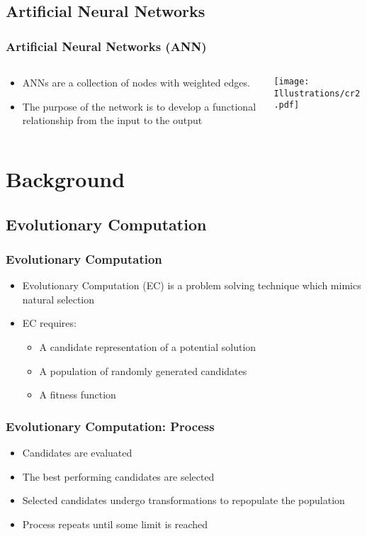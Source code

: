 \documentclass{beamer}
\begin{document}
\subsection{Artificial Neural Networks}
\begin{frame}
  \frametitle{Artificial Neural Networks (ANN)}
\begin{columns}
  \begin{column}{0.5\textwidth}
\begin{itemize}
\item  ANNs are a collection of nodes with weighted edges.
\item The purpose of the network is to develop a functional relationship from the input to the output
\end{itemize}
\end{column}
\begin{column}{0.5\textwidth}
 \texttt{[image: Illustrations/cr2.pdf]}
       \\
\end{column}
\end{columns}
\end{frame}

\section{Background}
	\subsection{Evolutionary Computation}
\begin{frame}
\frametitle{Evolutionary Computation}
 \begin{itemize}
\item Evolutionary Computation (EC) is a problem solving technique which mimics natural selection
\item EC requires:
\begin{itemize}
  \item A candidate representation of a potential solution
  \item A population of randomly generated candidates
  \item A fitness function
\end{itemize}
  \end{itemize}
\end{frame}

\begin{frame}
\frametitle{Evolutionary Computation: Process}
 \begin{itemize}
  \item Candidates are evaluated
  \item The best performing candidates are selected
  \item Selected candidates undergo transformations to repopulate the population
  \item Process repeats until some limit is reached
\end{itemize}
\end{frame}
\end{document}
